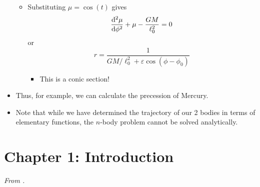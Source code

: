 \documentclass[../notes.tex]{subfiles}
\begin{document}
\begin{itemize}
\begin{itemize}
\begin{equation*}
        \end{equation*}
        \item Substituting $\mu=\cos(t)$ gives
        \begin{equation*}
            \dv[2]{\mu}{\phi}+\mu-\frac{GM}{\ell_0^2} = 0
        \end{equation*}
        or
        \begin{equation*}
            r = \frac{1}{GM/\ell_0^2+\varepsilon\cos(\phi-\phi_0)}
        \end{equation*}
        \begin{itemize}
            \item This is a conic section!
        \end{itemize}
    \end{itemize}
    \item Thus, for example, we can calculate the precession of Mercury.
    \item Note that while we have determined the trajectory of our 2 bodies in terms of elementary functions, the $n$-body problem cannot be solved analytically.
\end{itemize}



\section{Chapter 1: Introduction}
\emph{From \textcite{bib:Teschl}.}
\end{document}
